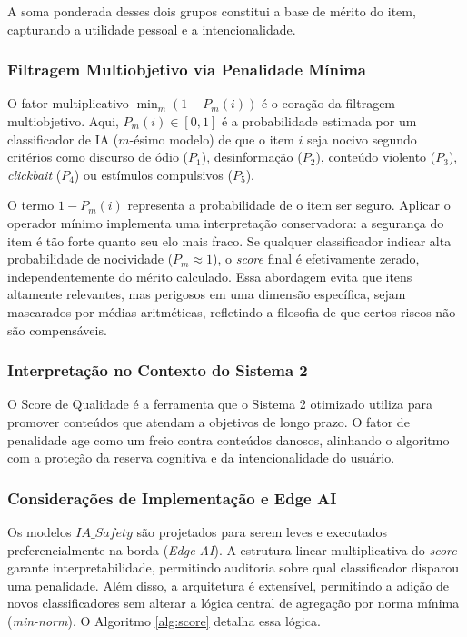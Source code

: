 \documentclass{sbc2023}
\begin{document}
A soma ponderada desses dois grupos constitui a base de mérito do item, capturando a utilidade pessoal e a intencionalidade.

\subsubsection{Filtragem Multiobjetivo via Penalidade Mínima} \label{sec:score_penalty}

O fator multiplicativo $\min_m(1 - P_m(i))$ é o coração da filtragem multiobjetivo. Aqui, $P_m(i) \in [0, 1]$ é a probabilidade estimada por um classificador de IA ($m$-ésimo modelo) de que o item $i$ seja nocivo segundo critérios como discurso de ódio ($P_1$), desinformação ($P_2$), conteúdo violento ($P_3$), \textit{clickbait} ($P_4$) ou estímulos compulsivos ($P_5$).

O termo $1 - P_m(i)$ representa a probabilidade de o item ser seguro. Aplicar o operador mínimo implementa uma interpretação conservadora: a segurança do item é tão forte quanto seu elo mais fraco. Se qualquer classificador indicar alta probabilidade de nocividade ($P_m \approx 1$), o \textit{score} final é efetivamente zerado, independentemente do mérito calculado. Essa abordagem evita que itens altamente relevantes, mas perigosos em uma dimensão específica, sejam mascarados por médias aritméticas, refletindo a filosofia de que certos riscos não são compensáveis.

\subsubsection{Interpretação no Contexto do Sistema 2} \label{sec:score_interpretation}

O Score de Qualidade é a ferramenta que o Sistema 2 otimizado utiliza para promover conteúdos que atendam a objetivos de longo prazo. O fator de penalidade age como um freio contra conteúdos danosos, alinhando o algoritmo com a proteção da reserva cognitiva e da intencionalidade do usuário.

\subsubsection{Considerações de Implementação e Edge AI} \label{sec:score_comp}

Os modelos $IA\_Safety$ são projetados para serem leves e executados preferencialmente na borda (\textit{Edge AI}). A estrutura linear multiplicativa do \textit{score} garante interpretabilidade, permitindo auditoria sobre qual classificador disparou uma penalidade. Além disso, a arquitetura é extensível, permitindo a adição de novos classificadores sem alterar a lógica central de agregação por norma mínima (\textit{min-norm}). O Algoritmo \ref{alg:score} detalha essa lógica.
\end{document}
